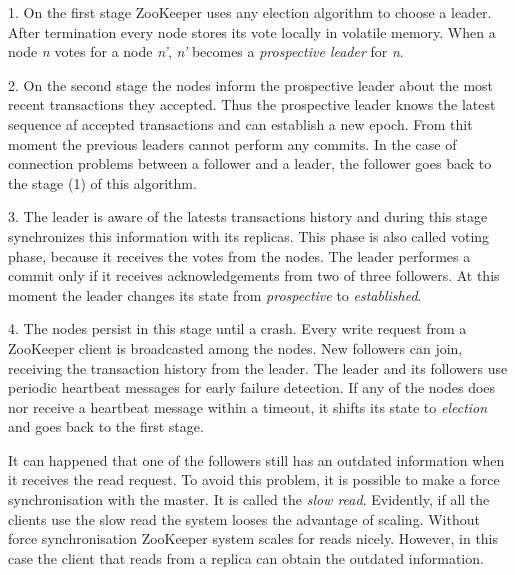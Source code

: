 1. On the first stage ZooKeeper uses any election algorithm to choose a leader.
After termination every node stores its vote locally in volatile memory.
When a node \textit{n} votes for a node \textit{n'}, \textit{n'} becomes a \textit{prospective leader} for \textit{n}.

2. On the second stage the nodes inform the prospective leader about the most recent transactions they accepted.
Thus the prospective leader knows the latest sequence af accepted transactions and can establish a new epoch.
From thit moment the previous leaders cannot perform any commits.
In the case of connection problems between a follower and a leader, the follower goes back to the stage (1) of this algorithm.

3. The leader is aware of the latests transactions history and during this stage synchronizes this information with its replicas.
This phase is also called voting phase, because it receives the votes from the nodes.
The leader performes a commit only if it receives acknowledgements from two of three followers.
At this moment the leader changes its state from \textit{prospective} to \textit{established}.

4. The nodes persist in this stage until a crash.
Every write request from a ZooKeeper client is broadcasted among the nodes.
New followers can join, receiving the transaction history from the leader.
The leader and its followers use periodic heartbeat messages for early failure detection.
If any of the nodes does nor receive a heartbeat message within a timeout, it shifts its state to \textit{election} and goes back to the first stage.

It can happened that one of the followers still has an outdated information when it receives the read request.
To avoid this problem, it is possible to make a force synchronisation with the master.
It is called the \textit{slow read}.
Evidently, if all the clients use the slow read the system looses the advantage of scaling.
Without force synchronisation ZooKeeper system scales for reads nicely. 
However, in this case the client that reads from a replica can obtain the outdated information.